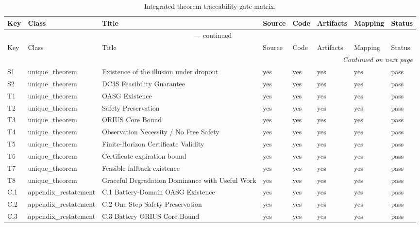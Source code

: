 \begin{small}
\begin{longtable}{@{}p{1.3cm}p{2.3cm}p{4.1cm}p{1.4cm}p{1.4cm}p{1.4cm}p{1.4cm}p{1.8cm}@{}}
\caption{Integrated theorem traceability-gate matrix.}
\label{tab:integrated-theorem-gate-matrix}\\
\toprule
Key & Class & Title & Source & Code & Artifacts & Mapping & Status \\
\midrule
\endfirsthead
\multicolumn{8}{c}{\tablename\ \thetable{} --- continued}\\
\toprule
Key & Class & Title & Source & Code & Artifacts & Mapping & Status \\
\midrule
\endhead
\midrule
\multicolumn{8}{r}{\textit{Continued on next page}}\\
\endfoot
\bottomrule
\endlastfoot
S1 & unique\_\allowbreak theorem & Existence of the illusion under dropout & yes & yes & yes & yes & pass \\
S2 & unique\_\allowbreak theorem & DC3S Feasibility Guarantee & yes & yes & yes & yes & pass \\
T1 & unique\_\allowbreak theorem & OASG Existence & yes & yes & yes & yes & pass \\
T2 & unique\_\allowbreak theorem & Safety Preservation & yes & yes & yes & yes & pass \\
T3 & unique\_\allowbreak theorem & ORIUS Core Bound & yes & yes & yes & yes & pass \\
T4 & unique\_\allowbreak theorem & Observation Necessity / No Free Safety & yes & yes & yes & yes & pass \\
T5 & unique\_\allowbreak theorem & Finite-Horizon Certificate Validity & yes & yes & yes & yes & pass \\
T6 & unique\_\allowbreak theorem & Certificate expiration bound & yes & yes & yes & yes & pass \\
T7 & unique\_\allowbreak theorem & Feasible fallback existence & yes & yes & yes & yes & pass \\
T8 & unique\_\allowbreak theorem & Graceful Degradation Dominance with Useful Work & yes & yes & yes & yes & pass \\
C.1 & appendix\_\allowbreak restatement & C.1 Battery-Domain OASG Existence & yes & yes & yes & yes & pass \\
C.2 & appendix\_\allowbreak restatement & C.2 One-Step Safety Preservation & yes & yes & yes & yes & pass \\
C.3 & appendix\_\allowbreak restatement & C.3 Battery ORIUS Core Bound & yes & yes & yes & yes & pass \\

\end{longtable}
\end{small}
